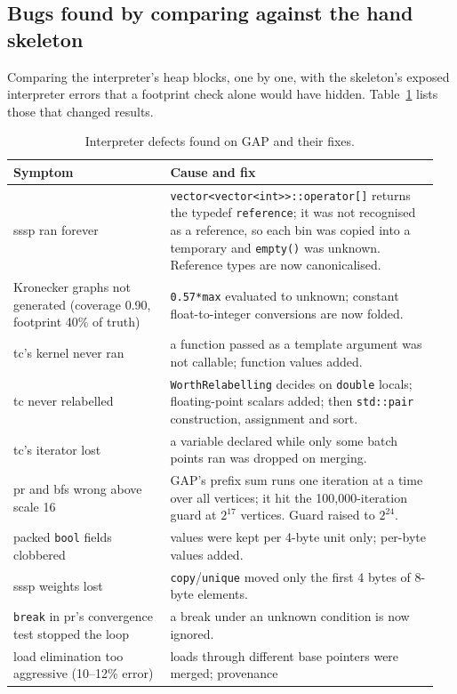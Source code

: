 \documentclass[11pt]{article}
\newcommand{\code}[1]{\texttt{#1}}
\newcommand{\tabref}[1]{Table~\ref{#1}}
\begin{document}
\subsection{Bugs found by comparing against the hand skeleton}

Comparing the interpreter's heap blocks, one by one, with the skeleton's exposed interpreter errors that a footprint
check alone would have hidden. \tabref{tab:bugs} lists those that changed results.

\begin{table}[!htbp]
\centering\small
\caption{Interpreter defects found on GAP and their fixes.}
\label{tab:bugs}
\begin{tabular}{>{\raggedright\arraybackslash}p{0.35\linewidth}>{\raggedright\arraybackslash}p{0.6\linewidth}}
\toprule
Symptom & Cause and fix \\
\midrule
sssp ran forever & \code{vector<vector<int>>::operator[]} returns the typedef \code{reference}; it was not recognised as a
reference, so each bin was copied into a temporary and \code{empty()} was unknown. Reference types are now
canonicalised. \\
Kronecker graphs not generated (coverage 0.90, footprint 40\% of truth) & \code{0.57*max} evaluated to unknown; constant
float-to-integer conversions are now folded. \\
tc's kernel never ran & a function passed as a template argument was not callable; function values added. \\
tc never relabelled & \code{WorthRelabelling} decides on \code{double} locals; floating-point scalars added; then
\code{std::pair} construction, assignment and sort. \\
tc's iterator lost & a variable declared while only some batch points ran was dropped on merging. \\
pr and bfs wrong above scale 16 & GAP's prefix sum runs one iteration at a time over all vertices; it hit the
100{,}000-iteration guard at $2^{17}$ vertices. Guard raised to $2^{24}$. \\
packed \code{bool} fields clobbered & values were kept per 4-byte unit only; per-byte values added. \\
sssp weights lost & \code{copy}/\code{unique} moved only the first 4 bytes of 8-byte elements. \\
\code{break} in pr's convergence test stopped the loop & a break under an unknown condition is now ignored. \\
load elimination too aggressive (10--12\% error) & loads through different base pointers were merged; provenance

\end{tabular}
\end{table}
\end{document}
